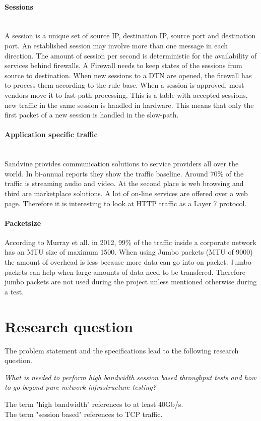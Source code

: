 \paragraph{Sessions}\label{par:sessions}\mbox{}\\
A session is a unique set of source IP, destination IP, source port and destination port. An established session may involve more than one message in each direction.
The amount of session per second is deterministic for the availability of services behind firewalls. A Firewall needs to keep states of the sessions from source to destination. 
When new sessions to a DTN are opened, the firewall has to process them according to the rule base. When a session is approved, most vendors move it to fast-path processing. 
This is a table with accepted sessions, new traffic in the same session is handled in hardware. This means that only the first packet of a new session is handled in the slow-path.

\paragraph{Application specific traffic}\mbox{}\\
Sandvine provides communication solutions to service providers all over the world. In bi-annual reports they show the traffic baseline. Around 70\% of the traffic is streaming audio and video. At the second place is web browsing and third are marketplace solutions. A lot of on-line services are offered over a web page. 
Therefore it is interesting to look at HTTP traffic as a Layer 7 protocol.

\paragraph{Packetsize}\label{par:packetsize}
According to Murray et all. \cite{murray2012state}  in 2012, 99\% of the traffic inside a corporate network has an MTU size of maximum 1500. When using Jumbo packets (MTU of 9000) the amount of overhead is less because more data can go into on packet. Jumbo packets can help when large amounts of data need to be transfered.  
Therefore jumbo packets are not used during the project unless mentioned otherwise during a test.

\section{Research question}\label{sec:researchquestion}
The problem statement and the specifications lead to the following research question.

\begin{center}
\textit{What is needed to perform high bandwidth session based throughput tests and how to go beyond pure network infrastructure testing?} \\
\end{center}
The term "high bandwidth" references to at least 40Gb/s. \\
The term "session based" references to TCP traffic. \\

